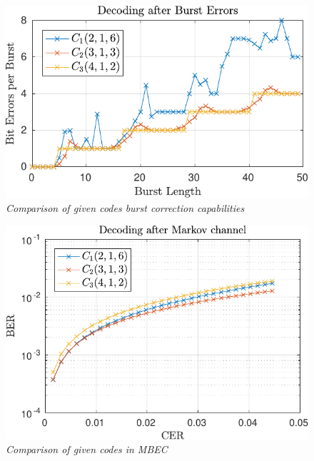 \begin{figure}
\centering
\includegraphics[scale=1]{../figures/qiburst.pdf} 
\caption{\textit{Comparison of given codes burst correction capabilities}\label{fig:givenBurstFigure}}
\end{figure}

\begin{figure}
\centering
\includegraphics[scale=1]{../figures/qimarkov.pdf} 
\caption{\textit{Comparison of given codes in MBEC}\label{fig:givenMarkovFigure}}
\end{figure}
